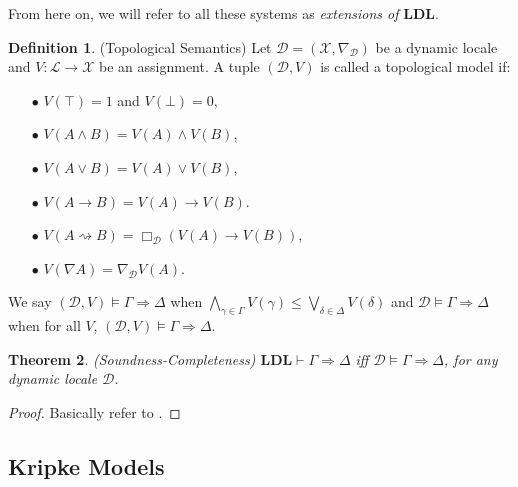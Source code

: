 \documentclass[12pt,a4paper]{article}
\theoremstyle{plain}
\newtheorem{thm}{Theorem}[section]
\theoremstyle{definition}
\newtheorem{dfn}[thm]{Definition}
\begin{document}
From here on, we will refer to all these systems as \emph{extensions of} $\mathbf{LDL}$.

\begin{dfn}\label{t4-1}(Topological Semantics)
Let $\mathcal{D}=(\mathscr{X}, \nabla_{\mathcal{D}})$ be a dynamic locale and $V:\mathcal{L} \to\mathscr{X}$ be an assignment. A tuple $(\mathcal{D}, V)$ is called a topological model if:
\begin{itemize}
\item[$\bullet$]
$V(\top)=1$ and $V(\bot)=0$,
\item[$\bullet$]
$V(A \wedge B)=V(A) \wedge V(B)$,
\item[$\bullet$]
$V(A \vee B)=V(A) \vee V(B)$,
\item[$\bullet$]
$V(A \rightarrow B)= V(A) \rightarrow V(B)$.
\item[$\bullet$]
$V(A \rightsquigarrow B)= \Box_{\mathcal{D}} (V(A) \rightarrow V(B))$,
\item[$\bullet$]
$V(\nabla A)=\nabla_{\mathcal{D}} V(A)$.
\end{itemize}
We say $(\mathcal{D}, V) \vDash \Gamma \Rightarrow \Delta$ when $\bigwedge_{\gamma \in \Gamma} V(\gamma) \leq \bigvee_{\delta \in \Delta} V(\delta)$ and $\mathcal{D} \vDash \Gamma \Rightarrow \Delta$ when for all $V$, $(\mathcal{D}, V) \vDash \Gamma \Rightarrow \Delta$.
\end{dfn}

\begin{thm}\label{t4-2}(Soundness-Completeness) $ \mathbf{LDL} \vdash \Gamma \Rightarrow \Delta$ iff $\mathcal{D} \vDash \Gamma \Rightarrow \Delta$, for any dynamic locale $\mathcal{D}$.


\end{thm}
\begin{proof}
Basically refer to \cite{Amir}.
\end{proof}

\subsection{Kripke Models} \label{KripkeModels}
\end{document}
